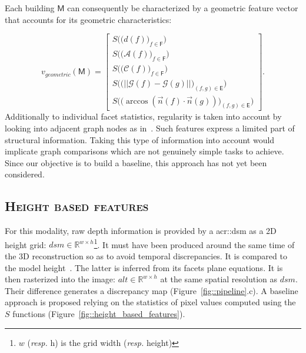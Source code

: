         Each building $\mathsf{M}$ can consequently be characterized by a geometric feature vector that accounts for its geometric characteristics:

        \begin{equation}
        	\label{eq::geom_feat}
            v_{geometric}(\mathsf{M}) = \begin{bmatrix}
            	S \Big(\big(d(f)\big)_{f \in \mathsf{F}}\Big)\\
                S \Big(\big(\mathscr{A}(f)\big)_{f \in \mathsf{F}}\Big)\\
                S \Big(\big(\mathscr{C}(f)\big)_{f \in \mathsf{F}}\Big)\\
                S \Big(\big( \vert\vert \mathscr{G}(f) - \mathscr{G}(g) \vert\vert \big)_{(f,g) \in \mathsf{E}}\Big)\\
                S\Big(\big( \arccos(\vec{n}(f) \cdot \vec{n}(g)) \big)_{(f,g) \in \mathsf{E}}\Big)
            \end{bmatrix}.
        \end{equation}
        Additionally to individual facet statistics, regularity is taken into account by looking into adjacent graph nodes as in~\parencite{zhou20102}.
        Such features express a limited  part of structural information.
        Taking this type of information into account would implicate graph comparisons which are not genuinely simple tasks to achieve.
        Since our objective is to build a baseline, this approach has not yet been considered.

    \subsection{\textsc{Height based features}}
        For this modality, raw depth information is provided by a \gls{acr::dsm} as a 2D height grid: $dsm \in \mathbb{R}^{w\times h}$\footnote{$w$ (\textit{resp.} h) is the grid width (\textit{resp.} height)}.
        It must have been produced around the same time of the 3D reconstruction so as to avoid temporal discrepancies.
        It is compared to the model height~\parencite{Bredif2007,zebedin2008fusion}.
        The latter is inferred from its facets plane equations.
        It is then rasterized into the image: $alt \in \mathbb{R}^{w\times h}$ at the same spatial resolution as $dsm$.
        Their difference generates a discrepancy map (Figure~\ref{fig::pipeline}.c).
        A baseline approach is proposed relying on the statistics of pixel values computed using the $S$ functions (Figure~\ref{fig::height_based_features}).

